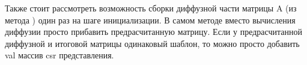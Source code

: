 \begin{itemize}
           Также стоит рассмотреть возможность сборки диффузной части матрицы A (из метода
           )  один раз на шаге инициализации.
           В самом методе вместо вычисления диффузии просто прибавить предрасчитанную матрицу.
           Если у предрасчитанной диффузной и итоговой матрицы одинаковый шаблон, то можно просто добавить val массив csr представления.
\end{itemize}
